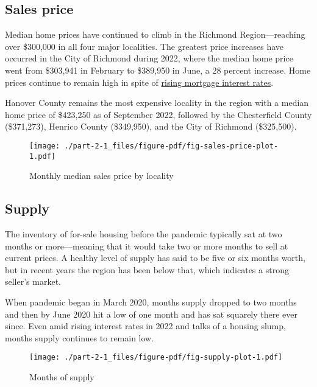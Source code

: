 \documentclass[
  letterpaper,
  DIV=11,
  numbers=noendperiod]{scrreprt}
\begin{document}
\hypertarget{sales-price}{%
\subsection{Sales price}\label{sales-price}}

Median home prices have continued to climb in the Richmond
Region---reaching over \$300,000 in all four major localities. The
greatest price increases have occurred in the City of Richmond during
2022, where the median home price went from \$303,941 in February to
\$389,950 in June, a 28 percent increase. Home prices continue to remain
high in spite of
\href{https://www.nar.realtor/magazine/real-estate-news/economy/mortgage-rates-october-20-2022}{rising
mortgage interest rates}.

Hanover County remains the most expensive locality in the region with a
median home price of \$423,250 as of September 2022, followed by the
Chesterfield County (\$371,273), Henrico County (\$349,950), and the
City of Richmond (\$325,500).

\begin{figure}

{\centering \texttt{[image: ./part-2-1\_files/figure-pdf/fig-sales-price-plot-1.pdf]}

}

\caption{\label{fig-sales-price-plot}Monthly median sales price by
locality}

\end{figure}

\hypertarget{supply-1}{%
\subsection{Supply}\label{supply-1}}

The inventory of for-sale housing before the pandemic typically sat at
two months or more---meaning that it would take two or more months to
sell at current prices. A healthy level of supply has said to be five or
six months worth, but in recent years the region has been below that,
which indicates a strong seller's market.

When pandemic began in March 2020, months supply dropped to two months
and then by June 2020 hit a low of one month and has sat squarely there
ever since. Even amid rising interest rates in 2022 and talks of a
housing slump, months supply continues to remain low.

\begin{figure}

{\centering \texttt{[image: ./part-2-1\_files/figure-pdf/fig-supply-plot-1.pdf]}

}

\caption{\label{fig-supply-plot}Months of supply}

\end{figure}
\end{document}
